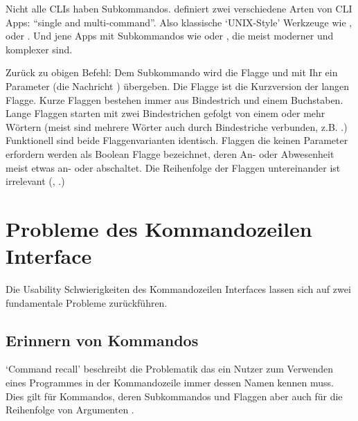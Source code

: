\documentclass[oneside,bibliography=totocnumbered,BCOR=5mm]{scrbook}
\begin{document}
Nicht alle CLIs haben Subkommandos. \textcite{12factor} definiert zwei verschiedene
Arten von CLI Apps: ``single and multi-command''. Also klassische `UNIX-Style'
Werkzeuge wie ,  oder . Und jene
Apps mit Subkommandos wie  oder , die meist
moderner und komplexer sind.

Zurück zu obigen  Befehl: Dem  Subkommando
wird die  Flagge und mit Ihr ein Parameter (die Nachricht
) übergeben. Die  Flagge ist die
Kurzversion der langen  Flagge. Kurze Flaggen bestehen
immer aus Bindestrich und einem Buchstaben. Lange Flaggen starten mit zwei
Bindestrichen gefolgt von einem oder mehr Wörtern (meist sind mehrere Wörter
auch durch Bindestriche verbunden, z.B. .)
Funktionell sind beide Flaggenvarianten identisch. Flaggen die keinen Parameter
erfordern werden als Boolean Flagge bezeichnet, deren An- oder Abwesenheit
meist etwas an- oder abschaltet. Die Reihenfolge der Flaggen untereinander ist
irrelevant (\textcite{nagarajan2018}, \textcite{clig}.)

\chapter{Probleme des Kommandozeilen Interface}
\label{sec:cli-problems}

Die Usability Schwierigkeiten des Kommandozeilen Interfaces lassen sich auf zwei
fundamentale Probleme zurückführen.

\section{Erinnern von Kommandos}

`Command recall' beschreibt die Problematik das ein Nutzer zum Verwenden eines
Programmes in der Kommandozeile immer dessen Namen kennen muss. Dies gilt für
Kommandos, deren Subkommandos und Flaggen aber auch für die Reihenfolge von
Argumenten \parencite{Raskin_2008}.

\bigskip

\newcommand{\refcr}[1]{\hyperref[prob:cr]{#1}}
\newcommand{\refcrr}{\hyperref[prob:cr]{`Command Recall'}}
\end{document}
